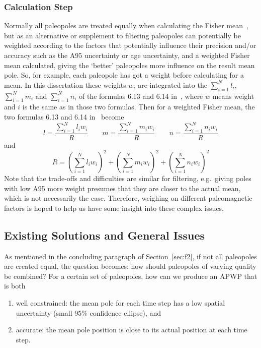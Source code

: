 \subsubsection{Calculation Step}

Normally all paleopoles are treated equally when calculating the Fisher
mean~\citep[see how to calculate a Fisher mean using the formulas 6.12, 6.13,
6.14 and 6.15 in][chap. 6; note that instead of direction declination and
inclination expected in those formulas, pole longitude and latitude should be
used]{B92}, but as an alternative or supplement to filtering paleopoles can
potentially be weighted according to the factors that potentially influence
their precision and/or accuracy such as the A95 uncertainty or age uncertainty,
and a weighted Fisher mean calculated, giving the `better' paleopoles more
influence on the result mean pole. So, for example, each paleopole has got a
weight before calculating for a mean. In this dissertation these weights $w_i$
are integrated into the $\sum\limits_{i=1}^N l_i$, $\sum\limits_{i=1}^N m_i$ and
$\sum\limits_{i=1}^N n_i$ of the formulas 6.13 and 6.14 in~\citet[chap.~6]{B92},
where $w$ means weight and $i$ is the same as in those two formulas. Then for a
weighted Fisher mean, the two formulas 6.13 and 6.14 in~\citet[chap.~6]{B92}
become
%
\begin{equation}
  l = \frac{\sum\limits_{i=1}^N l_{i}w_i}{R} \quad\quad
  m = \frac{\sum\limits_{i=1}^N m_{i}w_i}{R} \quad\quad
  n = \frac{\sum\limits_{i=1}^N n_{i}w_i}{R}
\end{equation}
%
and
%
\begin{equation}
  R = {\left( \sum\limits_{i=1}^N l_{i}w_i \right)}^2
    + {\left( \sum\limits_{i=1}^N m_{i}w_i \right)}^2
    + {\left( \sum\limits_{i=1}^N n_{i}w_i \right)}^2
\end{equation}
%
Note that the trade-offs and difficulties are similar for filtering, e.g.\
giving poles with low A95 more weight presumes that they are closer to the
actual mean, which is not necessarily the case. Therefore, weighing on different
paleomagnetic factors is hoped to help us have some insight into these complex
issues.

\subsection{Existing Solutions and General Issues}\label{sec:si}

As mentioned in the concluding paragraph of Section~\ref{sec:f2}, if not all
paleopoles are created equal, the question becomes: how should paleopoles of
varying quality be combined? For a certain set of paleopoles, how can we produce
an APWP that is both
\begin{enumerate}
  \item well constrained: the mean pole for each time step has a low spatial
  uncertainty (small 95\% confidence ellipse), and
  \item accurate: the mean pole position is close to its actual position at each
  time step.
\end{enumerate}


